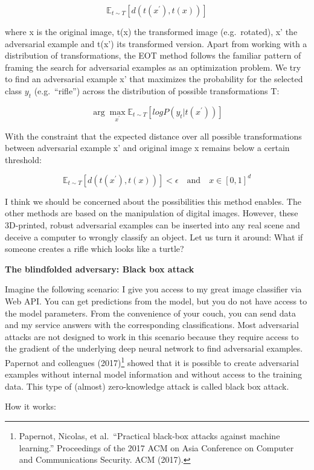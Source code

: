 \documentclass[
  12pt,
]{krantz}
\begin{document}
\[\mathbb{E}_{t\sim{}T}[d(t(x^\prime),t(x))]\]

where x is the original image, t(x) the transformed image (e.g.~rotated), x' the adversarial example and t(x') its transformed version.
Apart from working with a distribution of transformations, the EOT method follows the familiar pattern of framing the search for adversarial examples as an optimization problem.
We try to find an adversarial example x' that maximizes the probability for the selected class \(y_t\) (e.g.~``rifle'') across the distribution of possible transformations T:

\[\arg\max_{x^\prime}\mathbb{E}_{t\sim{}T}[log{}P(y_t|t(x^\prime))]\]

With the constraint that the expected distance over all possible transformations between adversarial example x' and original image x remains below a certain threshold:

\[\mathbb{E}_{t\sim{}T}[d(t(x^\prime),t(x))]<\epsilon\quad\text{and}\quad{}x\in[0,1]^d\]

I think we should be concerned about the possibilities this method enables.
The other methods are based on the manipulation of digital images.
However, these 3D-printed, robust adversarial examples can be inserted into any real scene and deceive a computer to wrongly classify an object.
Let us turn it around: What if someone creates a rifle which looks like a turtle?

\textbf{The blindfolded adversary: Black box attack}

Imagine the following scenario:
I give you access to my great image classifier via Web API.
You can get predictions from the model, but you do not have access to the model parameters.
From the convenience of your couch, you can send data and my service answers with the corresponding classifications.
Most adversarial attacks are not designed to work in this scenario because they require access to the gradient of the underlying deep neural network to find adversarial examples.
Papernot and colleagues (2017)\footnote{Papernot, Nicolas, et al.~``Practical black-box attacks against machine learning.'' Proceedings of the 2017 ACM on Asia Conference on Computer and Communications Security. ACM (2017).} showed that it is possible to create adversarial examples without internal model information and without access to the training data.
This type of (almost) zero-knowledge attack is called black box attack.

How it works:
\end{document}
